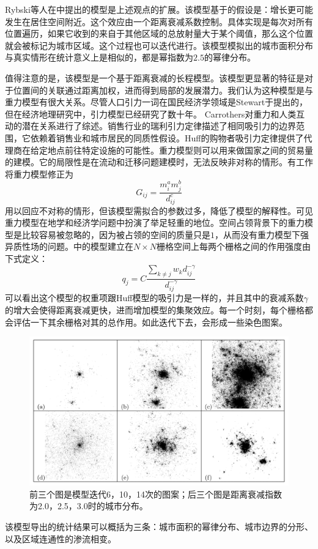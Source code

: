 Rybski等人在\cite{PhysRevE.87.042114}中提出的模型是上述观点的扩展。该模型基于的假设是：增长更可能发生在居住空间附近。这个效应由一个距离衰减系数控制。具体实现是每次对所有位置遍历，如果它收到的来自于其他区域的总放射量大于某个阈值，那么这个位置就会被标记为城市区域。这个过程也可以迭代进行。该模型模拟出的城市面积分布与真实情形在统计意义上是相似的，都是幂指数为$2.5$的幂律分布。

值得注意的是，该模型是一个基于距离衰减的长程模型。该模型更显著的特征是对于位置间的关联通过距离加权，进而得到局部的发展潜力。我们认为这种模型是与重力模型有很大关系。尽管人口引力一词在国民经济学领域是Stewart于\cite{10.2307/2785468}提出的，但在经济地理研究中，引力模型已经研究了数十年。 Carrothers\cite{carrothers1956historical}对重力和人类互动的潜在关系进行了综述。销售行业的瑞利引力定律描述了相同吸引力的边界范围\cite{reilly1931law}，它依赖着销售业和城市居民的同质性假设。Huff的购物者吸引力定律\cite{10.2307/3144521}提供了代理商在给定地点前往特定设施的可能性。重力模型则可以用来做国家之间的贸易量的建模。它的局限性是在流动和迁移问题建模时，无法反映非对称的情形。有工作将重力模型修正为\[G_{ij} = \frac{m_i^am_j^b}{d_{ij}^c}\]用以回应不对称的情形，但该模型需拟合的参数过多，降低了模型的解释性。可见重力模型在地学和经济学问题中扮演了举足轻重的地位。空间占领背景下的重力模型是比较容易被忽略的，因为被占领的空间的质量只是$1$，从而没有重力模型下强异质性场的问题。\cite{PhysRevE.87.042114}中的模型建立在$N\times N$栅格空间上每两个栅格之间的作用强度由下式定义：\[q_j = C\frac{\sum_{k\ne j}w_k d_{ij}^{-\gamma}}{d_{ij}^{-\gamma}}\]可以看出这个模型的权重项跟Huff模型的吸引力是一样的，并且其中的衰减系数$\gamma$的增大会使得距离衰减更快，进而增加模型的集聚效应。每一个时刻，每个栅格都会评估一下其余栅格对其的总作用。如此迭代下去，会形成一些染色图案。\begin{figure}
    \centering
    \includegraphics[width=\textwidth]{pictures/distance-weighted.png}
    \caption{前三个图是模型迭代6，10，14次的图案；后三个图是距离衰减指数为2.0，2.5，3.0时的城市分布。}
\end{figure}
该模型导出的统计结果可以概括为三条：城市面积的幂律分布、城市边界的分形、以及区域连通性的渗流相变。

